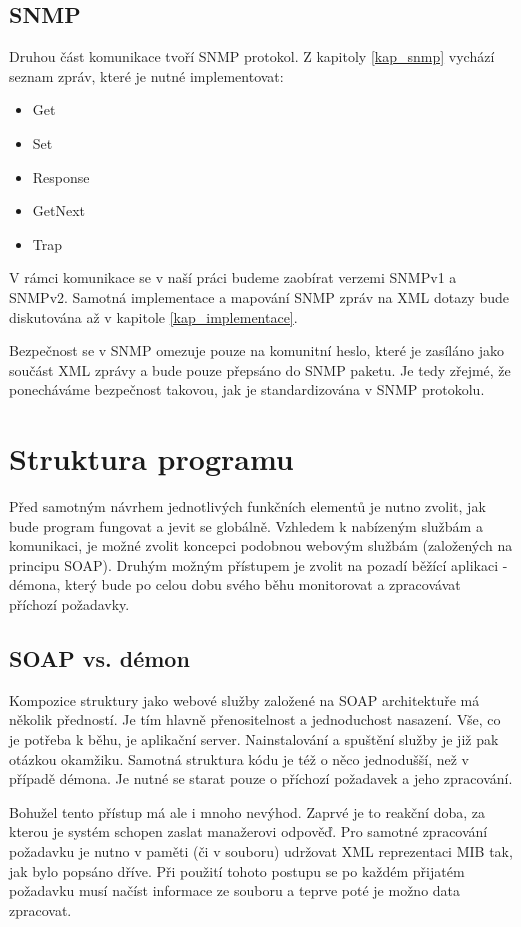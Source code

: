 \subsection{SNMP}
Druhou část komunikace tvoří SNMP protokol. Z kapitoly \ref{kap_snmp} vychází seznam zpráv, které je nutné implementovat:
\begin{itemize}
	\item Get
	\item Set
	\item Response
	\item GetNext
	\item Trap
\end{itemize}

V rámci komunikace se v naší práci budeme zaobírat verzemi SNMPv1 a SNMPv2. Samotná implementace a mapování SNMP zpráv na XML dotazy
bude diskutována až v kapitole \ref{kap_implementace}.

Bezpečnost se v SNMP omezuje pouze na komunitní heslo, které je zasíláno jako součást XML zprávy a bude pouze přepsáno do SNMP paketu. 
Je tedy zřejmé, že ponecháváme bezpečnost takovou, jak je standardizována v SNMP protokolu.


\section{Struktura programu}
\label{sec_an_struktura_programu}
Před samotným návrhem jednotlivých funkčních elementů je nutno zvolit, jak bude program fungovat a jevit se globálně. Vzhledem k
nabízeným službám a komunikaci, je možné zvolit koncepci podobnou webovým službám (založených na principu SOAP). Druhým možným přístupem je zvolit
na pozadí běžící aplikaci - démona, který bude po celou dobu svého běhu monitorovat a zpracovávat příchozí požadavky.

\subsection{SOAP vs. démon}
Kompozice struktury jako webové služby založené na SOAP architektuře má několik předností. Je tím hlavně přenositelnost a jednoduchost nasazení. Vše, co je potřeba k běhu,
je aplikační server. Nainstalování a spuštění služby je již pak otázkou okamžiku. Samotná struktura kódu je též o něco jednodušší, než v případě démona. Je nutné se starat pouze o
příchozí požadavek a jeho zpracování.

Bohužel tento přístup má ale i mnoho nevýhod. Zaprvé je to reakční doba, za kterou je systém schopen zaslat manažerovi odpověď. Pro samotné zpracování požadavku
je nutno v paměti (či v souboru) udržovat XML reprezentaci MIB tak, jak bylo popsáno dříve. Při použití tohoto postupu se po každém přijatém požadavku musí načíst informace ze souboru
a teprve poté je možno data zpracovat.


